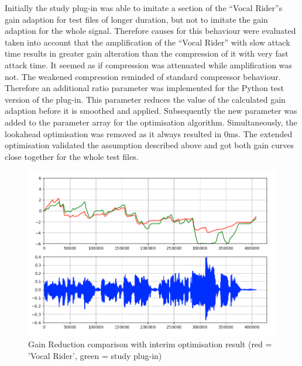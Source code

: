 Initially the study plug-in was able to imitate a section of the “Vocal Rider”s gain adaption for test files of longer duration, but not to imitate the gain adaption for the whole signal. Therefore causes for this behaviour were evaluated taken into account that the amplification of the “Vocal Rider” with slow attack time results in greater gain alteration than the compression of it with very fast attack time. It seemed as if compression was attenuated while amplification was not. The weakened compression reminded of standard compressor behaviour. Therefore an additional ratio parameter was implemented for the Python test version of the plug-in. This parameter reduces the value of the calculated gain adaption before it is smoothed and applied. Subsequently the new parameter was added to the parameter array for the optimisation algorithm. Simultaneously, the lookahead optimisation was removed as it always resulted in 0ms. The extended optimisation validated the assumption described above and got both gain curves close together for the whole test files.\\

\begin{figure}[H]
\includegraphics[width=\textwidth]{images/onlyParts}
\caption{Gain Reduction comparison with interim optimisation result (red = 'Vocal Rider', green = study plug-in)}
\end{figure}

